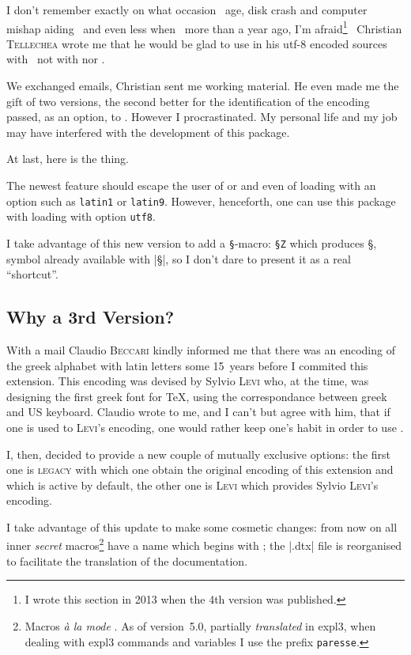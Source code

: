 \documentclass[full, english]{l3doc}
\newcommand*\PS{\texttt{\S}\xspace}
\newcommand*\PSVerb[1]{\texttt{\S #1}}
\newcommand\Option[1]{\textsc{#1}}
\newcommand{\TO}{\textemdash\ \ignorespaces}
\newcommand{\TF}{\unskip\ \textemdash\xspace}
\begin{document}
I don't remember exactly on what occasion \TO age, disk crash and computer
mishap aiding\TF and even less when \TO more than a year ago, I'm
afraid\footnote{I wrote this section in 2013 when the 4th version was
  published.}\TF Christian \textsc{Tellechea} wrote me that he would be
glad to use  in his utf-8 encoded sources with 
\TO not with  nor .

We exchanged emails, Christian sent me working material. He even made
me the gift of two versions, the second better for the identification
of the encoding passed, as an option, to . However I
procrastinated. My personal life and my job may have interfered with
the development of this package.

At last, here is the thing.

The newest feature should escape the user of 
or  and even of  loading 
with an option such as \texttt{latin1} or \texttt{latin9}. However,
henceforth, one can use this package with  loading
 with option \texttt{utf8}.

I take advantage of this new version to add a \PS-macro:
\PSVerb{Z} which produces \S, symbol already available with
|\S|, so I don't dare to present it as a real ``shortcut''.

\subsection{Why a 3rd Version?}

With a mail Claudio \textsc{Beccari} kindly informed me that there was
an encoding of the greek alphabet with latin letters some 15~years
before I commited this extension. This encoding was devised by Sylvio
\textsc{Levi} who, at the time, was designing the first greek font for
\TeX, using the correspondance between greek and US keyboard. Claudio
wrote to me, and I can't but agree with him, that if one is used to
\textsc{Levi}'s encoding, one would rather keep one's habit in order
to use .

I, then, decided to provide a new couple of mutually exclusive
options: the first one is \Option{legacy} with which one obtain the
original encoding of this extension and which is active by default,
the other one is \Option{Levi} which provides Sylvio \textsc{Levi}'s
encoding.

I take advantage of this update to make some cosmetic changes: from now on
all inner \emph{secret} macros\footnote{Macros \emph{à la mode}
  \LaTeXe{}. As of version~5.0, partially \emph{translated} in expl3, when
  dealing with expl3 commands and variables I use the prefix
  \texttt{paresse}.} have a name which begins with ; the |.dtx|
file is reorganised to facilitate the translation of the documentation.
\end{document}
